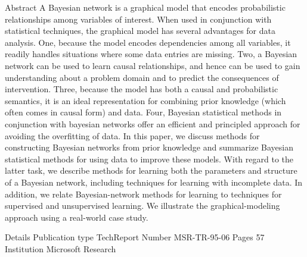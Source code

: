 Abstract
A Bayesian network is a graphical model that encodes probabilistic relationships among variables of interest. When used in conjunction with statistical techniques, the graphical model has several advantages for data analysis. One, because the model encodes dependencies among all variables, it readily handles situations where some data entries are missing. Two, a Bayesian network can be used to learn causal relationships, and hence can be used to gain understanding about a problem domain and to predict the consequences of intervention. Three, because the model has both a causal and probabilistic semantics, it is an ideal representation for combining prior knowledge (which often comes in causal form) and data. Four, Bayesian statistical methods in conjunction with bayesian networks offer an efficient and principled approach for avoiding the overfitting of data. In this paper, we discuss methods for constructing Bayesian networks from prior knowledge and summarize Bayesian statistical methods for using data to improve these models. With regard to the latter task, we describe methods for learning both the parameters and structure of a Bayesian network, including techniques for learning with incomplete data. In addition, we relate Bayesian-network methods for learning to techniques for supervised and unsupervised learning. We illustrate the graphical-modeling approach using a real-world case study.

Details
Publication type	TechReport
Number	MSR-TR-95-06
Pages	57
Institution	Microsoft Research

